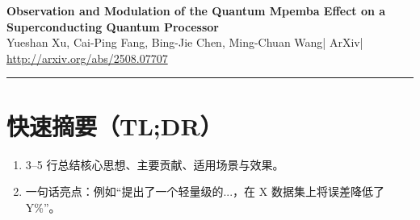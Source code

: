 \documentclass[11pt,a4paper]{article}
\newcommand{\PaperMeta}{}
\newcommand{\PaperTitle}{}
\newcommand{\PaperAuthors}{}
\newcommand{\PaperVenue}{}
\newcommand{\PaperYear}{}
\newcommand{\PaperLink}{}
\begin{document}
\renewcommand{\PaperTitle}{Observation and Modulation of the Quantum Mpemba Effect on a Superconducting Quantum Processor}
\renewcommand{\PaperAuthors}{Yueshan Xu, Cai-Ping Fang, Bing-Jie Chen, Ming-Chuan Wang}
\renewcommand{\PaperVenue}{ArXiv}
\renewcommand{\PaperYear}{2025}
\renewcommand{\PaperLink}{http://arxiv.org/abs/2508.07707}
\renewcommand{\PaperMeta}{\PaperTitle\ --- \PaperYear}

\begin{center}
    {\LARGE \textbf{\PaperTitle}}\\[6pt]
    {\small \PaperAuthors \quad | \quad \PaperVenue \quad | \quad \PaperYear}\\
    {\small \url{\PaperLink}}
\end{center}

\tableofcontents
\vspace{6pt}
\hrule
\vspace{10pt}

\section*{快速摘要（TL;DR）}
\begin{enumerate}[leftmargin=*]
    \item 3--5 行总结核心思想、主要贡献、适用场景与效果。
    \item 一句话亮点：例如“提出了一个轻量级的...，在 X 数据集上将误差降低了 Y\%”。
\end{enumerate}
\end{document}
